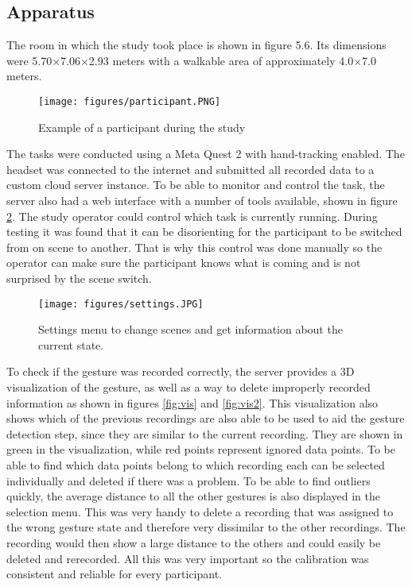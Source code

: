 



\subsection{Apparatus}

The room in which the study took place is shown in figure 5.6. Its dimensions were 5.70×7.06×2.93 meters with a walkable area of approximately 4.0×7.0 meters.

\begin{figure}[!ht]
    \centering
    \texttt{[image: figures/participant.PNG]}
    \caption{Example of a participant during the study}
    \label{fig:video}
\end{figure}

The tasks were conducted using a Meta Quest 2 with hand-tracking enabled. The headset was connected to the internet and submitted all recorded data to a custom cloud server instance. To be able to monitor and control the task, the server also had a web interface with a number of tools available, shown in figure \ref{fig:settings}. The study operator could control which task is currently running. During testing it was found that it can be disorienting for the participant to be switched from on scene to another. That is why this control was done manually so the operator can make sure the participant knows what is coming and is not surprised by the scene switch.

\begin{figure}[!ht]
    \centering
    \texttt{[image: figures/settings.JPG]}
    \caption{Settings menu to change scenes and get information about the current state.}
    \label{fig:settings}
\end{figure}

To check if the gesture was recorded correctly, the server provides a 3D visualization of the gesture, as well as a way to delete improperly recorded information as shown in figures \ref{fig:vis} and  \ref{fig:vis2}. This visualization also shows which of the previous recordings are also able to be used to aid the gesture detection step, since they are similar to the current recording. They are shown in green in the visualization, while red points represent ignored data points. To be able to find which data points belong to which recording each can be selected individually and deleted if there was a problem. To be able to find outliers quickly, the average distance to all the other gestures is also displayed in the selection menu. This was very handy to delete a recording that was assigned to the wrong gesture state and therefore very dissimilar to the other recordings. The recording would then show a large distance to the others and could easily be deleted and rerecorded. All this was very important so the calibration was consistent and reliable for every participant.

